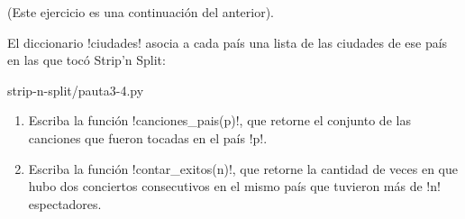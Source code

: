 (Este ejercicio es una continuación del anterior).

El diccionario \li!ciudades!
asocia a cada país
una lista de las ciudades de ese país
en las que tocó Strip'n Split:

   {strip-n-split/pauta3-4.py}

\begin{enumerate}
  \item Escriba la función \li!canciones_pais(p)!,
    que retorne el conjunto de las canciones
    que fueron tocadas en el país \li!p!.
  \item Escriba la función \li!contar_exitos(n)!,
    que retorne la cantidad de veces en que
    hubo dos conciertos consecutivos
    en el mismo país
    que tuvieron más de \li!n! espectadores.
\end{enumerate}

